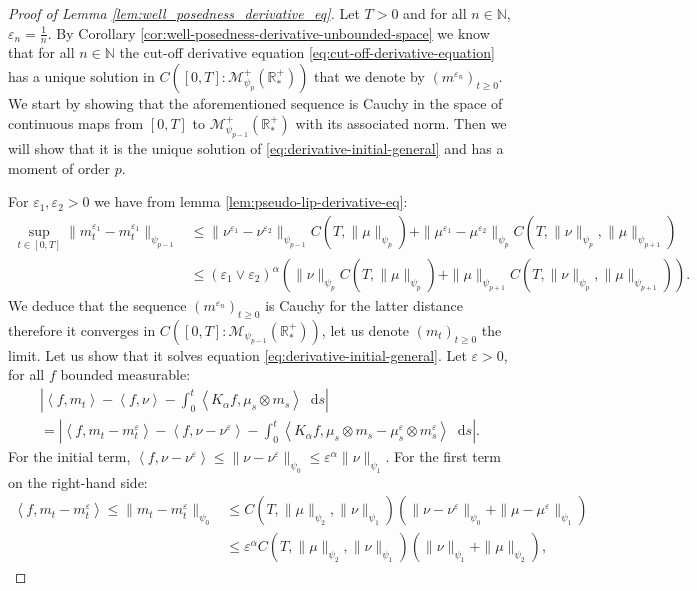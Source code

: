 \documentclass[11pt,a4paper]{article}
\newcommand{\NN}{\mathbb{N}}
\newcommand{\RRP}{\mathbb{R}^+_*}
\newcommand{\MC}{\mathcal{M}}
\newcommand{\Proc}[1]{\left(#1\right)_{t\geq 0}}
\newcommand{\brac}[1]{\left\langle#1\right\rangle}
\newcommand{\dd}{\mathop{}\!\mathrm{d}}
\begin{document}
\begin{proof}[Proof of Lemma \ref{lem:well_posedness_derivative_eq}]
    Let $T > 0$ and for all $n\in \NN$, $\varepsilon_n = \frac1n$. By Corollary \ref{cor:well-posedness-derivative-unbounded-space} we know that for all $n \in \NN$ the cut-off derivative equation \eqref{eq:cut-off-derivative-equation} has a unique solution in $C\left([0,T]: \MC_{\psi_{p}}^+ (\RRP)\right)$ that we denote by $\Proc{m^{\varepsilon_n}}$. We start by showing that the aforementioned sequence is Cauchy in the space of continuous maps from $[0,T]$ to $\MC_{\psi_{p-1}}^+ (\RRP)$ with its associated norm. Then we will show that it is the unique solution of \eqref{eq:derivative-initial-general} and has a moment of order $p$.
    
    For $\varepsilon_1, \varepsilon_2 > 0$ we have from lemma \ref{lem:pseudo-lip-derivative-eq}:
    \begin{align*}
        \sup\limits_{t\in [0,T]} \| m^{\varepsilon_1}_t - m^{\varepsilon_1}_t\|_{\psi_{p-1}} 
        &\leq \|\nu^{\varepsilon_1} - \nu^{\varepsilon_2}\|_{\psi_{p-1}} C(T,\|\mu\|_{\psi_{p}}) + \|\mu^{\varepsilon_1} - \mu^{\varepsilon_2}\|_{\psi_{p}}C(T,\|\nu\|_{\psi_p},\|\mu\|_{\psi_{p+1}}) \\
        &\leq \left(\varepsilon_1 \vee \varepsilon_2\right)^{\alpha} \left(\|\nu\|_{\psi_{p}} C(T,\|\mu\|_{\psi_{p}}) + \|\mu\|_{\psi_{p+1}}C(T,\|\nu\|_{\psi_p},\|\mu\|_{\psi_{p+1}})\right).
    \end{align*}
    We deduce that the sequence $\Proc{m^{\varepsilon_n}}$ is Cauchy for the latter distance therefore it converges in $C\left([0,T]:\MC_{\psi_{p-1}}(\RRP)\right)$, let us denote $\Proc{m_t}$ the limit. Let us show that it solves equation \eqref{eq:derivative-initial-general}. Let $\varepsilon > 0$, for all $f$ bounded measurable:
    \begin{multline*}
        \left| \brac{f,m_t} - \brac{f,\nu} - \int_0^t \brac{K_\alpha f,\mu_s \otimes m_s} \dd s\right|\\
        = \left| \brac{f,m_t- m^\varepsilon_t} - \brac{f,\nu - \nu^\varepsilon} - \int_0^t \brac{K_\alpha f,\mu_s \otimes m_s - \mu^\varepsilon_s \otimes m^\varepsilon_s} \dd s\right|.
    \end{multline*}
    For the initial term, $\brac{f,\nu - \nu^\varepsilon} \leq \|\nu - \nu^\varepsilon\|_{\psi_0} \leq \varepsilon^\alpha\|\nu\|_{\psi_1}$. For the first term on the right-hand side:
    \begin{align*}
        \brac{f,m_t- m^\varepsilon_t}\leq \|m_t - m_t^\varepsilon\|_{\psi_0} &\leq C(T,\|\mu\|_{\psi_2},\|\nu\|_{\psi_1}) \left(\|\nu- \nu^\varepsilon\|_{\psi_0} + \|\mu- \mu^\varepsilon\|_{\psi_1}\right)\\ &\leq \varepsilon^\alpha C(T,\|\mu\|_{\psi_2},\|\nu\|_{\psi_1}) \left(\|\nu\|_{\psi_1} + \|\mu\|_{\psi_2}\right),

\end{align*}
\end{proof}
\end{document}
